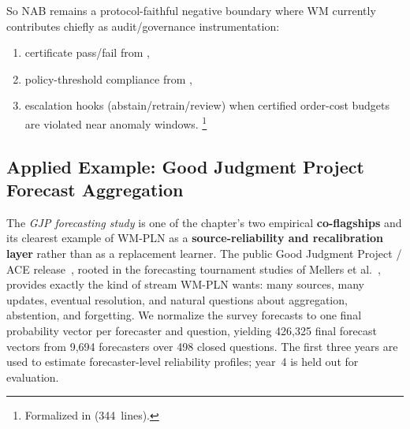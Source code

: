 \documentclass[11pt,openany]{report}
\begin{document}
So NAB remains a protocol-faithful negative boundary where WM currently
contributes chiefly as audit/governance instrumentation:
\begin{enumerate}
\item certificate pass/fail from
  ,
\item policy-threshold compliance from
  ,
\item escalation hooks (abstain/retrain/review) when certified order-cost
  budgets are violated near anomaly windows.%
  \footnote{Formalized in  (344~lines).}
\end{enumerate}

\subsection{Applied Example: Good Judgment Project Forecast Aggregation}

The \emph{GJP forecasting study} is one of the chapter's two empirical
\textbf{co-flagships} and its clearest example of WM-PLN as a
\textbf{source-reliability and recalibration layer} rather than as a
replacement learner.  The public Good Judgment Project / ACE
release~\cite{IARPA2024GJPData}, rooted in the forecasting tournament
studies of Mellers et al.~\cite{Mellers2014PsychologicalStrategies},
provides exactly the kind of stream WM-PLN wants: many sources, many
updates, eventual resolution, and natural questions about aggregation,
abstention, and forgetting.  We normalize the survey forecasts to one
final probability vector per forecaster and question, yielding
426{,}325 final forecast vectors from 9{,}694 forecasters over 498
closed questions.  The first three years are used to estimate
forecaster-level reliability profiles; year~4 is held out for
evaluation.

\begin{center}
\end{center}
\end{document}
